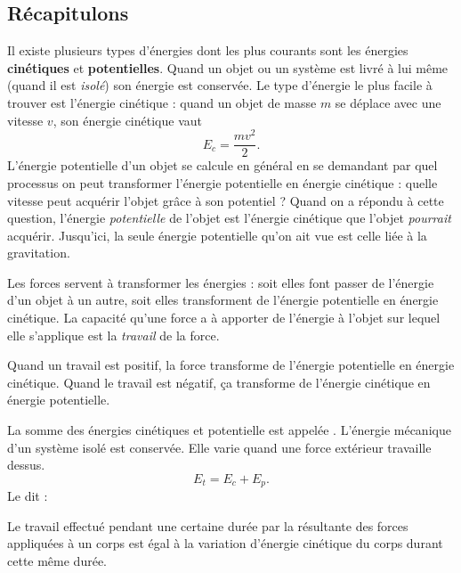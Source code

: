 \subsection{Récapitulons}

Il existe plusieurs types d'énergies dont les plus courants sont les énergies {\bf cinétiques} et {\bf potentielles}. Quand un objet ou un système est livré à lui même (quand il est \emph{isolé}) son énergie est conservée. Le type d'énergie le plus facile à trouver est l'énergie cinétique : quand un objet de masse $m$ se déplace avec une vitesse $v$, son énergie cinétique vaut
\begin{equation}
E_c=\frac{mv^2}{2}.
\end{equation}
L'énergie potentielle d'un objet se calcule en général en se demandant par quel processus on peut transformer l'énergie potentielle en énergie cinétique : quelle vitesse peut acquérir l'objet grâce à son potentiel ? Quand on a répondu à cette question, l'énergie \emph{potentielle} de l'objet est l'énergie cinétique que l'objet \emph{pourrait} acquérir. Jusqu'ici, la seule énergie potentielle qu'on ait vue est celle liée à la gravitation.

Les forces servent à transformer les énergies : soit elles font passer de l'énergie d'un objet à un autre, soit elles transforment de l'énergie potentielle en énergie cinétique. La capacité qu'une force a à apporter de l'énergie à l'objet sur lequel elle s'applique est la \emph{travail} de la force. 

Quand un travail est positif, la force transforme de l'énergie potentielle en énergie cinétique. Quand le travail est négatif, ça transforme de l'énergie cinétique en énergie potentielle.

La somme des énergies cinétiques et potentielle est appelée . L'énergie mécanique d'un système isolé est conservée. Elle varie quand une force extérieur travaille dessus.
\begin{equation}
E_t=E_c+E_p.
\end{equation}
Le  dit  :

\begin{theoreme}
Le travail effectué pendant une certaine durée par la résultante des forces appliquées à un corps est égal à la variation d'énergie cinétique du corps durant cette même durée.
\end{theoreme}


